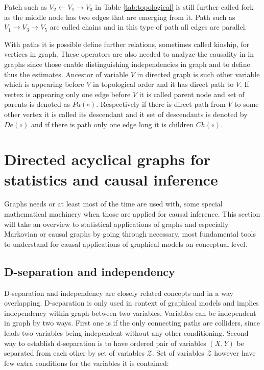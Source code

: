 \documentclass[main=english,12pt,a4paper,pdftex,econ,utf8]{aaltothesis}
\newcommand{\ch}[1]{Ch(#1)}
\newcommand{\pa}[1]{Pa(#1)}
\newcommand{\de}[1]{De(#1)}
\newcommand{\z}{\mathcal{Z}}
\begin{document}
Patch such as $V_{2}\leftarrow V_{1}\rightarrow V_{3}$ in Table \ref{tab:topological} is still further called fork as the middle node has two edges that are emerging from it. Path such as $V_{1}\rightarrow V_{3}\rightarrow V_{5}$ are called chains and in this type of path all edges are parallel.

With paths it is possible define further relations, sometimes called kinship, for vertices in graph. These operators are also needed to analyze the causality in in graphs since those enable distinguishing independencies in graph and to define thus the estimates. Ancestor of variable $V$ in directed graph is such other variable which is appearing before $V$ in topological order and it has direct path to $V$. If vertex is appearing only one edge before $V$ it is called parent node and set of parents is denoted as $\pa{\circ}$. Respectively if there is direct path from $V$ to some other vertex it is called its descendant and it set of descendants is denoted by $\de{\circ}$ and if there is path only one edge long it is children $\ch{\circ}$.

\clearpage

\section{Directed acyclical graphs for statistics and causal inference}

Graphs needs or at least most of the time are used with, some special mathematical machinery when those are applied for causal inference. This section will take an overview to statistical applications of graphs and especially Markovian or causal graphs by going through necessary, most fundamental tools to understand for causal applications of graphical models on conceptual level.

\subsection{D-separation and independency}

D-separation and independency are closely related concepts and in a way overlapping. D-separation is only used in context of graphical models and implies independency within graph between two variables. Variables can be independent in graph by two ways. First one is if the only connecting paths are colliders, since leads two variables being independent without any other conditioning. Second way to establish d-separation is to have ordered pair of variables $(X, Y)$ be separated from each other by set of variables $\z$. Set of variables $\z$ however have few extra conditions for the variables it is contained:
\end{document}
